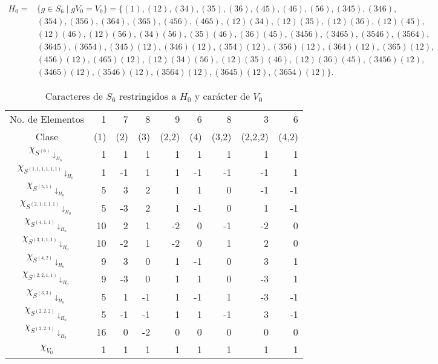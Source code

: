 \documentclass[12pt]{book}
\theoremstyle{definition}
\newcounter{in}
\begin{document}
  \begin{footnotesize}
    \begin{align*}
      H_{0}=&\{g\in S_{6}\mid
      gV_{0}=V_{0}\}=\{(1),(12),(34),(35),(36),(45),(46),(56),(345),(346),\\
      &(354),(356),(364),(365),(456),(465),(12)(34),(12)(35),(12)(36),(12)(45),\\
      &(12)(46),(12)(56),(34)(56),(35)(46),(36)(45),(3456),(3465),(3546),(3564),\\
      &(3645),(3654),(345)(12),(346)(12),(354)(12),(356)(12),(364)(12),(365)(12),\\
      &(456)(12),(465)(12),(12)(34)(56),(12)(35)(46),(12)(36)(45),(3456)(12),\\
      &(3465)(12),(3546)(12),(3564)(12),(3645)(12),(3654)(12)\}.
    \end{align*}
  \end{footnotesize}

 \begin{table}[!hbtp]
    \centering
    \begin{tabular}{c |r r r r r r r r}
      No. de Elementos  & 1 & 7 & 8 & 9 & 6 & 8 & 3 & 6  \\
      Clase&(1)& (2) & (3) & (2,2) & (4)& (3,2) & (2,2,2) & (4,2)\\
      \hline
      $\chi_{S^{{(6)}}\downarrow_{H_{0}}}$         & 1 & 1  & 1  & 1 & 1 & 1 & 1 & 1 \\
      $\chi_{S^{{(1,1,1,1,1,1)}}\downarrow_{H_{0}}}$ & 1 & -1 & 1  & 1 & -1&-1 &-1 & 1 \\
      $\chi_{S^{{(5,1)}}\downarrow_{H_{0}}}$       & 5 & 3  & 2  & 1 & 1 & 0 &-1 &-1 \\
      $\chi_{S^{{(2,1,1,1,1)}}\downarrow_{H_{0}}}$  & 5 & -3 &  2 & 1 &-1 & 0 & 1 &-1  \\
      $\chi_{S^{{(4,1,1)}}\downarrow_{H_{0}}}$     & 10& 2  & 1  & -2& 0 &-1 &-2 & 0  \\
      $\chi_{S^{{(3,1,1,1)}}\downarrow_{H_{0}}}$    & 10&-2  & 1  &-2 & 0 & 1 & 2 & 0 \\
      $\chi_{S^{{(4,2)}}\downarrow_{H_{0}}}$       & 9 & 3  & 0  & 1 & -1& 0 & 3 & 1 \\
      $\chi_{S^{{(2,2,1,1)}}\downarrow_{H_{0}}}$    & 9 & -3 & 0  & 1 & 1 & 0 &-3 & 1 \\
      $\chi_{S^{{(3,3)}}\downarrow_{H_{0}}}$       & 5 & 1  & -1  & 1 &-1 &1 & -3& -1 \\
      $\chi_{S^{{(2,2,2)}}\downarrow_{H_{0}}}$     & 5  & -1& -1  & 1 & 1 & -1& 3 & -1 \\
      $\chi_{S^{{(3,2,1)}}\downarrow_{H_{0}}}$     & 16 & 0 & -2  & 0 & 0 & 0 & 0 & 0 \\
      \hline
      $\chi_{V_{0}}$        & 1 & 1 & 1 & 1 & 1 & 1 &1 & 1  \\
    \end{tabular}

    \caption{Caracteres de $S_{6}$ restringidos a $H_{0}$ y carácter de $V_{0}$}
    \label{tab:restriccion-H_0-M-6}
  \end{table}
\end{document}
